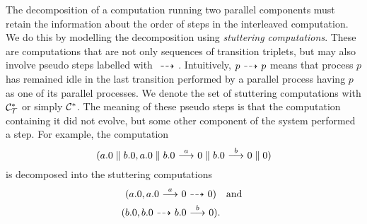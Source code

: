 The decomposition of a computation running two parallel components must retain the
information about the order of steps in the interleaved computation. We do this
by modelling the decomposition using {\em stuttering computations}. These are
computations that are not only sequences of transition triplets, but may also involve
pseudo steps labelled with $\ {\stackrel{_{}}{\dashrightarrow}}\ $. Intuitively, $p\ {\stackrel{_{}}{\dashrightarrow}}\  p$ means that
process $p$ has remained idle in the last transition performed by a parallel process
having $p$ as one of its parallel processes.
We denote
the set of stuttering computations with $\mathcal{C}_{\mathcal{T}}^*$ or simply $\mathcal{C}^*$.
The meaning of these pseudo steps is that
the computation containing it did not evolve, but some other component of the
system performed a step. For example, the computation
\[
(a.0\parallel b.0,
a.0\parallel b.0 \ {\stackrel{{a}}{\longrightarrow}}\ 
0\parallel b.0 \ {\stackrel{{b}}{\longrightarrow}}\ 
0\parallel 0)
\]
is decomposed into the stuttering computations
\begin{gather*}
    (a.0,a.0 \trans{a}0 \ptrans{}0) \quad\textrm{and}\\
    (b.0,b.0 \ptrans{} b.0 \trans{b} 0).\quad\phantom{\textrm{and}}
\end{gather*}
%
